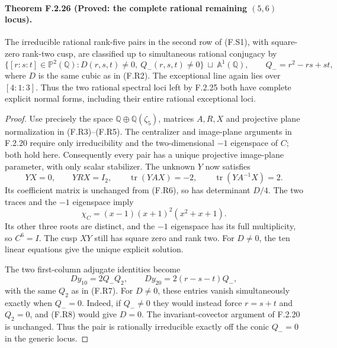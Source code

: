 \paragraph{Theorem F.2.26 (Proved: the complete rational remaining $(5,6)$ locus).}
The irreducible rational rank-five pairs in the second row
of (F.S1), with square-zero rank-two cusp, are classified
up to simultaneous rational conjugacy by
\[
 \{[r:s:t]\in\mathbb P^2(\mathbb Q):
             D(r,s,t)\ne0,\ Q_-(r,s,t)\ne0\}
       \ \sqcup\ \mathbb A^1(\mathbb Q),
 \qquad Q_-=r^2-rs+st,
 \tag{F.R10}
\]
where $D$ is the same cubic as in (F.R2).
The exceptional line again lies over $[4:1:3]$.
Thus the two rational spectral loci left by F.2.25 both
have complete explicit normal forms, including their
entire rational exceptional loci.

\begin{proof}
Use precisely the space $\mathbb Q\oplus\mathbb Q(\zeta_5)$,
matrices $A,R,X$ and projective plane normalization in
(F.R3)--(F.R5).  The centralizer and image-plane arguments
in F.2.20 require only irreducibility and the two-dimensional
$-1$ eigenspace of $C$; both hold here.
Consequently every pair has a unique projective image-plane
parameter, with only scalar stabilizer.
The unknown $Y$ now satisfies
\[
 YX=0,\qquad YRX=I_2,\qquad
 \operatorname{tr}(YAX)=-2,\qquad
 \operatorname{tr}(YA^{-1}X)=2.
 \tag{F.R11}
\]
Its coefficient matrix is unchanged from (F.R6), so has
determinant $D/4$.
The two traces and the $-1$ eigenspace imply
\[
 \chi_C=(x-1)(x+1)^2(x^2+x+1).
\]
Its other three roots are distinct, and the $-1$ eigenspace
has its full multiplicity, so $C^6=I$.
The cusp $XY$ still has square zero and rank two.
For $D\ne0$, the ten linear equations give the unique
explicit solution.

The two first-column adjugate identities become
\[
 D y_{10}=2Q_-Q_2,
 \qquad D y_{20}=2(r-s-t)Q_-,
 \tag{F.R12}
\]
with the same $Q_2$ as in (F.R7).
For $D\ne0$, these entries vanish simultaneously exactly
when $Q_-=0$.
Indeed, if $Q_-\ne0$ they would instead force
$r=s+t$ and $Q_2=0$, and (F.R8) would give $D=0$.
The invariant-covector argument of F.2.20 is unchanged.
Thus the pair is rationally irreducible exactly off the
conic $Q_-=0$ in the generic locus.


\end{proof}
